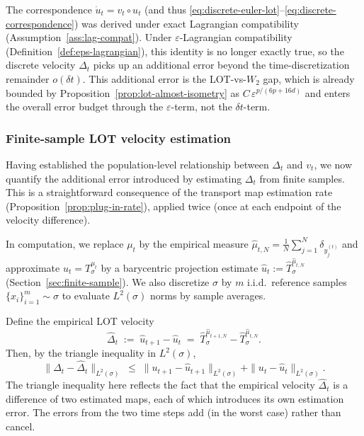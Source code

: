 \documentclass[11pt]{article}
\newcommand{\1}{\mathbf{1}}
\begin{document}
The correspondence $\dot u_t = v_t \circ u_t$ (and thus
\eqref{eq:discrete-euler-lot}--\eqref{eq:discrete-correspondence})
was derived under exact Lagrangian compatibility
(Assumption~\ref{ass:lag-compat}). Under $\varepsilon$-Lagrangian compatibility (Definition~\ref{def:eps-lagrangian}), this identity is no longer exactly true, so the discrete velocity $\Delta_t$ picks up an additional error beyond the time-discretization remainder $o(\delta t)$. This additional error is the LOT-vs-$W_2$ gap, which is already bounded by Proposition~\ref{prop:lot-almost-isometry} as $C\,\varepsilon^{p/(6p+16d)}$ and enters the overall error budget through the $\varepsilon$-term, not the $\delta t$-term.



\subsubsection{Finite-sample LOT velocity estimation}

Having established the population-level relationship between $\Delta_t$
and $v_t$, we now quantify the additional error introduced by estimating $\Delta_t$ from finite samples. This is a straightforward consequence of the transport map estimation rate (Proposition~\ref{prop:plug-in-rate}), applied twice (once at each endpoint of the velocity difference). 

In computation, we replace $\mu_t$ by the empirical measure
$\hat\mu_{t,N}=\frac1N\sum_{j=1}^N\delta_{y_j^{(t)}}$ and approximate
$u_t=T_\sigma^{\mu_t}$ by a barycentric projection estimate
$\hat u_t := \hat T_\sigma^{\hat\mu_{t,N}}$ (Section~\ref{sec:finite-sample}). We also discretize $\sigma$ by $m$ i.i.d.\ reference samples
$\{x_i\}_{i=1}^m\sim\sigma$ to evaluate $L^2(\sigma)$ norms by sample averages.

Define the empirical LOT velocity
\begin{equation}\label{eq:empirical-delta}
  \hat\Delta_t \;:=\; \hat u_{t+1}-\hat u_t
  \;=\; \hat T_\sigma^{\hat\mu_{t+1,N}}-\hat T_\sigma^{\hat\mu_{t,N}}.
\end{equation}
Then, by the triangle inequality in $L^2(\sigma)$,
\begin{equation}\label{eq:delta-sample-error}
  \|\Delta_t-\hat\Delta_t\|_{L^2(\sigma)}
  \;\le\;
  \|u_{t+1}-\hat u_{t+1}\|_{L^2(\sigma)}
  +\|u_t-\hat u_t\|_{L^2(\sigma)}.
\end{equation}
The triangle inequality here reflects the fact that the empirical velocity $\hat{\Delta}_t$ is a difference of two estimated maps, each of which introduces its own estimation error. The errors from the two time steps add (in the worst case) rather than cancel.
\end{document}
